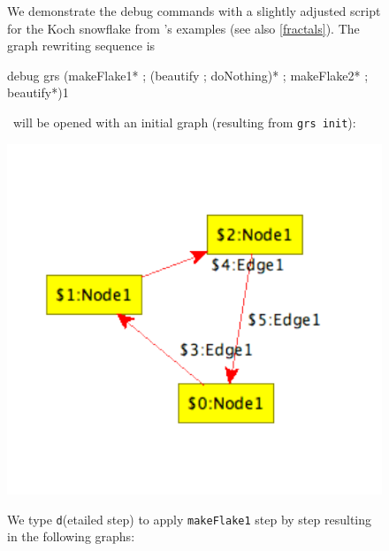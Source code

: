 \begin{figure}[htbp]
\begin{example}   
We demonstrate the debug commands with a slightly adjusted script for the Koch snowflake from \GrG's examples (see also \ref{fractals}). The graph rewriting sequence is
\begin{grshell}
debug grs (makeFlake1* ; (beautify ; doNothing)* ; makeFlake2* ; beautify*){1}
\end{grshell}
\yComp\ will be opened with an initial graph (resulting from \texttt{grs init}):
\begin{center}
  \includegraphics[width=0.3\linewidth]{fig/debug0tra}
\end{center}
We type \texttt{d}(etailed step) to apply \texttt{makeFlake1} step by step resulting in the following graphs:
\begin{center}

\end{center}
\end{example}
\end{figure}
